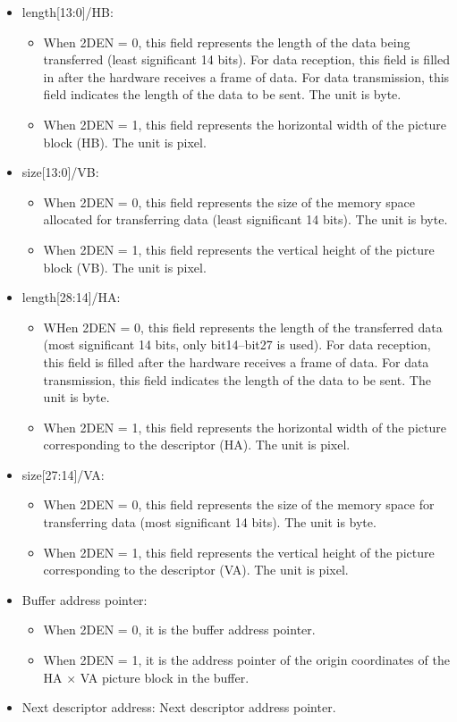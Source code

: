 \documentclass[main\_\_EN.tex]{subfiles}
\begin{document}
\begin{itemize}
\item length[13:0]/HB:
    \begin{itemize}
    \item When 2DEN = 0, this field represents the length of the data being transferred (least significant 14 bits). For data reception, this field is filled in after the hardware receives a frame of data. For data transmission, this field indicates the length of the data to be sent. The unit is byte.
    \item When 2DEN = 1, this field represents the horizontal width of the picture block (HB). The unit is pixel.
    \end{itemize}

\item size[13:0]/VB:
    \begin{itemize}
    \item When 2DEN = 0, this field represents the size of the memory space allocated for transferring data (least significant 14 bits). The unit is byte.
    \item When 2DEN = 1, this field represents the vertical height of the picture block (VB). The unit is pixel.
    \end{itemize}
\item length[28:14]/HA:
    \begin{itemize}
    \item WHen 2DEN = 0, this field represents the length of the transferred data (most significant 14 bits, only bit14–bit27 is used). For data reception, this field is filled after the hardware receives a frame of data. For data transmission, this field indicates the length of the data to be sent. The unit is byte.
    \item When 2DEN = 1, this field represents the horizontal width of the picture corresponding to the descriptor (HA). The unit is pixel.
    \end{itemize}
\item size[27:14]/VA:
    \begin{itemize}
    \item When 2DEN = 0, this field represents the size of the memory space for transferring data (most significant 14 bits). The unit is byte.
    \item When 2DEN = 1, this field represents the vertical height of the picture corresponding to the descriptor (VA). The unit is pixel.
    \end{itemize}
\item Buffer address pointer:
    \begin{itemize}
    \item When 2DEN = 0, it is the buffer address pointer.
    \item When 2DEN = 1, it is the address pointer of the origin coordinates of the HA × VA picture block in the buffer.
    \end{itemize}
\item Next descriptor address: Next descriptor address pointer.
\end{itemize}
\end{document}
